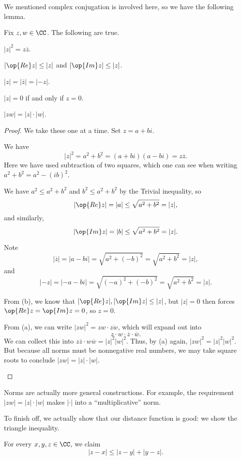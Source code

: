 We mentioned complex conjugation is involved here, so we have the following lemma.
\begin{lemma}
	Fix $z,w\in\CC$. The following are true.
	\begin{listalph}
		\item $|z|^2=z\overline z$.
		\item $|\op{Re}z|\le|z|$ and $|\op{Im}z|\le|z|$.
		\item $|z|=|\overline z|=|-z|$.
		\item $|z|=0$ if and only if $z=0$.
		\item $|zw|=|z|\cdot|w|$.
	\end{listalph}
\end{lemma}
\begin{proof}
	We take these one at a time. Set $z=a+bi$.
	\begin{listalph}
		\item We have
		\[|z|^2=a^2+b^2=(a+bi)(a-bi)=z\overline z.\]
		Here we have used subtraction of two squares, which one can see when writing $a^2+b^2=a^2-(ib)^2$.
		\item We have $a^2\le a^2+b^2$ and $b^2\le a^2+b^2$ by the Trivial inequality, so
		\[|\op{Re}z|=|a|\le\sqrt{a^2+b^2}=|z|,\]
		and similarly,
		\[|\op{Im}z|=|b|\le\sqrt{a^2+b^2}=|z|.\]
		\item Note
		\[|\overline z|=|a-bi|=\sqrt{a^2+(-b)^2}=\sqrt{a^2+b^2}=|z|,\]
		and
		\[|-z|=|-a-bi|=\sqrt{(-a)^2+(-b)^2}=\sqrt{a^2+b^2}=|z|.\]
		\item From (b), we know that $|\op{Re}z|,|\op{Im}z|\le|z|$, but $|z|=0$ then forces $\op{Re}z=\op{Im}z=0$, so $z=0$.
		\item From (a), we can write $|zw|^2=zw\cdot\overline{zw}$, which will expand out into
		\[z\cdot w\cdot\overline z\cdot\overline w.\]
		We can collect this into $z\overline z\cdot w\overline w=|z|^2|w|^2$. Thus, by (a) again, $|zw|^2=|z|^2|w|^2$. But because all norms must be nonnegative real numbers, we may take square roots to conclude $|zw|=|z|\cdot|w|$.
		\qedhere
	\end{listalph}
\end{proof}
\begin{remark}
	Norms are actually more general constructions. For example, the requirement $|zw|=|z|\cdot|w|$ makes $|\cdot|$ into a ``multiplicative'' norm.
\end{remark}
To finish off, we actually show that our distance function is good: we show the triangle inequality.
\begin{lemma}
	For every $x,y,z\in\CC$, we claim
	\[|z-x|\le|z-y|+|y-z|.\]
\end{lemma}
